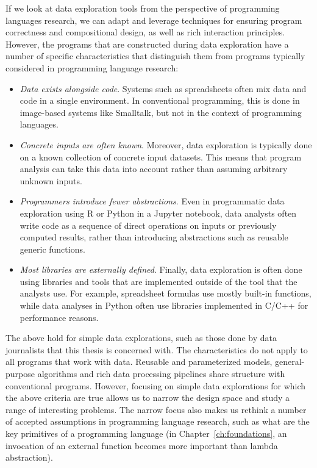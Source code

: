 \documentclass[fleqn,11pt]{report}
\theoremstyle{definition}
\newenvironment{nitemize}
{ \vspace{-0.4em}
  \begin{itemize}
    \setlength{\itemsep}{5pt}
    \setlength{\parskip}{0pt}
    \setlength{\parsep}{0pt} }
{ \end{itemize}
  \vspace{-0.4em} }
\begin{document}
\noindent
If we look at data exploration tools from the perspective of programming languages research,
we can adapt and leverage techniques for ensuring program correctness and compositional design,
as well as rich interaction principles. However, the programs that are constructed during data
exploration have a number of specific characteristics that distinguish them from programs typically
considered in programming language research:

\begin{nitemize}
\item \emph{Data exists alongside code}. Systems such as spreadsheets often mix
  data and code in a single environment. In conventional programming, this is done in
  image-based systems like Smalltalk, but not in the context of programming languages.

\item \emph{Concrete inputs are often known}. Moreover, data exploration is typically done on a
  known collection of concrete input datasets. This means that program analysis can take
  this data into account rather than assuming arbitrary unknown inputs.

\item \emph{Programmers introduce fewer abstractions}. Even in programmatic data exploration using
  R or Python in a Jupyter notebook, data analysts often write code as a sequence of
  direct operations on inputs or previously computed results, rather than introducing abstractions
  such as reusable generic functions.

\item \emph{Most libraries are externally defined}. Finally, data exploration is
  often done using libraries and tools that are implemented outside of the tool that the analysts
  use. For example, spreadsheet formulas use mostly built-in functions, while data analyses in
  Python often use libraries implemented in C/C++ for performance reasons.
\end{nitemize}

The above hold for simple data explorations, such as those done by data journalists
that this thesis is concerned with. The characteristics do not apply to all programs that work with
data. Reusable and parameterized models, general-purpose algorithms and rich data processing
pipelines share structure with conventional programs. However, focusing on simple
data explorations for which the above criteria are true allows us to narrow the design
space and study a range of interesting problems. The narrow focus also makes us rethink a number of
accepted assumptions in programming language research, such as what are the key primitives
of a programming language (in Chapter~\ref{ch:foundations}, an invocation of an external
function becomes more important than lambda abstraction).
\end{document}
